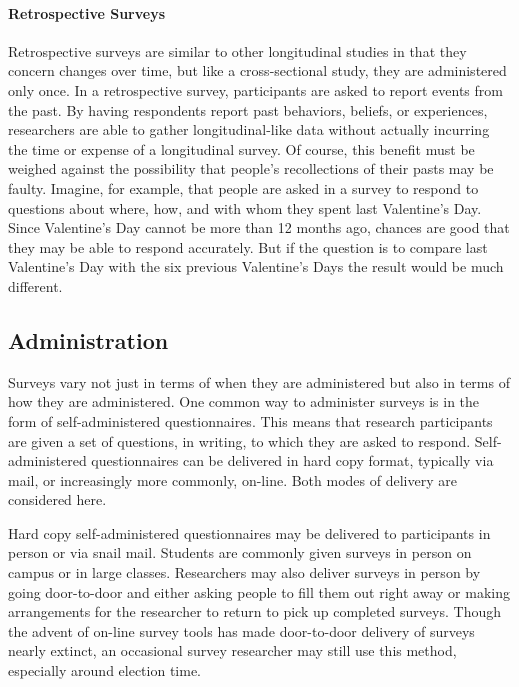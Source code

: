 \paragraph{Retrospective Surveys}

Retrospective surveys are similar to other longitudinal studies in that they concern changes over time, but like a cross-sectional study, they are administered only once. In a retrospective survey, participants are asked to report events from the past. By having respondents report past behaviors, beliefs, or experiences, researchers are able to gather longitudinal-like data without actually incurring the time or expense of a longitudinal survey. Of course, this benefit must be weighed against the possibility that people's recollections of their pasts may be faulty. Imagine, for example, that people are asked in a survey to respond to questions about where, how, and with whom they spent last Valentine's Day. Since Valentine's Day cannot be more than 12 months ago, chances are good that they may be able to respond accurately. But if the question is to compare last Valentine's Day with the six previous Valentine's Days the result would be much different.

\subsection{Administration}

Surveys vary not just in terms of when they are administered but also in terms of how they are administered. One common way to administer surveys is in the form of self-administered questionnaires. This means that research participants are given a set of questions, in writing, to which they are asked to respond. Self-administered questionnaires can be delivered in hard copy format, typically via mail, or increasingly more commonly, on-line. Both modes of delivery are considered here.

Hard copy self-administered questionnaires may be delivered to participants in person or via snail mail. Students are commonly given surveys in person on campus or in large classes. Researchers may also deliver surveys in person by going door-to-door and either asking people to fill them out right away or making arrangements for the researcher to return to pick up completed surveys. Though the advent of on-line survey tools has made door-to-door delivery of surveys nearly extinct, an occasional survey researcher may still use this method, especially around election time.

